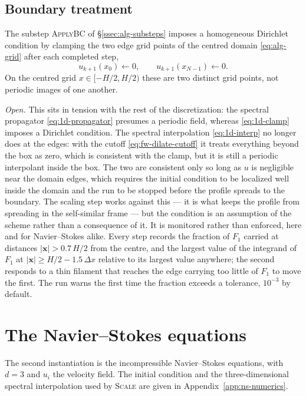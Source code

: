 \documentclass{article}
\begin{document}
\subsection{Boundary treatment}\label{ssec:1d-boundary}

The substep \textsc{ApplyBC} of \S\ref{ssec:alg-substeps} imposes a homogeneous
Dirichlet condition by clamping the two edge grid points of the centred domain
\eqref{eq:alg-grid} after each completed step,
\begin{equation}\label{eq:1d-clamp}
  u_{k+1}(x_0) \gets 0, \qquad u_{k+1}(x_{N-1}) \gets 0 .
\end{equation}
On the centred grid $x \in [-H/2, H/2)$ these are two distinct grid points, not
periodic images of one another.

\emph{Open.} This sits in tension with the rest of the discretization: the
spectral propagator \eqref{eq:1d-propagator} presumes a periodic field, whereas
\eqref{eq:1d-clamp} imposes a Dirichlet condition. The spectral interpolation
\eqref{eq:1d-interp} no longer does at the edges: with the cutoff
\eqref{eq:fw-dilate-cutoff} it treats everything beyond the box as zero, which
is consistent with the clamp, but it is still a periodic interpolant inside the
box. The two are consistent only
so long as $u$ is negligible near the domain edges, which requires the initial
condition to be localized well inside the domain and the run to be stopped
before the profile spreads to the boundary. The scaling step works against
this --- it is what keeps the profile from spreading in the self-similar frame
--- but the condition is an assumption of the scheme rather than a consequence
of it. It is monitored rather than enforced, here and for Navier--Stokes alike.
Every step records the fraction of $F_1$ carried at distances
$|\mathbf{x}| > 0.7\, H/2$ from the centre, and the largest value of the
integrand of $F_1$ at $|\mathbf{x}| \ge H/2 - 1.5\, \Delta x$ relative to its
largest value anywhere; the second responds to a thin filament that reaches
the edge carrying too little of $F_1$ to move the first. The run warns the first time the fraction exceeds a
tolerance, $10^{-3}$ by default.

\section{The Navier--Stokes equations}\label{sec:ns}

The second instantiation is the incompressible Navier--Stokes equations, with
$d = 3$ and $u_i$ the velocity field. The initial condition and the
three-dimensional spectral interpolation used by \textsc{Scale} are given in
Appendix~\ref{app:ns-numerics}.
\end{document}
